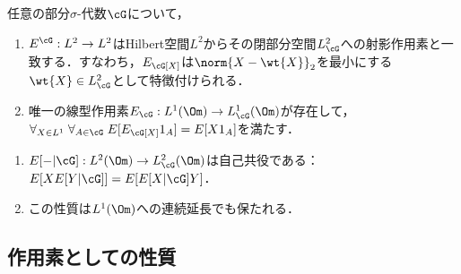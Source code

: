 \documentclass[uplatex,dvipdfmx]{jsreport}
\begin{document}
\begin{theorem}[射影としての特徴付け]
    任意の部分$\sigma$-代数$\cG$について，
    \begin{enumerate}
        \item $E^\cG:L^2\to L^2$はHilbert空間$L^2$からその閉部分空間$L_\cG^2$への射影作用素と一致する．すなわち，$E_\cG[X]$は$\norm{X-\wt{X}}_2$を最小にする$\wt{X}\in L_\cG^2$として特徴付けられる．
        \item 唯一の線型作用素$E_\cG:L^1(\Om)\to L^1_\cG(\Om)$が存在して，$\forall_{X\in L^1}\;\forall_{A\in\cG}\;E[E_\cG[X]1_A]=E[X1_A]$を満たす．
    \end{enumerate}
\end{theorem}

\begin{theorem}\mbox{}
    \begin{enumerate}
        \item $E[-|\cG]:L^2(\Om)\to L^2_\cG(\Om)$は自己共役である：$E[XE[Y|\cG]]=E[E[X|\cG]Y]$．
        \item この性質は$L^1(\Om)$への連続延長でも保たれる．
    \end{enumerate}
\end{theorem}

\subsection{作用素としての性質}
\end{document}
